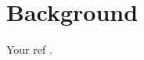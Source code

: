 \documentclass[../../../main.tex]{subfiles}
\begin{document}
\section{Background}
Your ref \parencite{Hang2024}.
\end{document}
